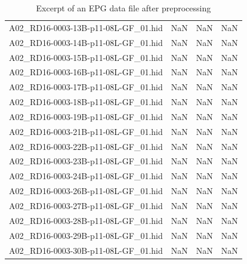 \begin{landscape}
\begin{table}[htbp]
\begin{tabular}{lrrr}
 A02\_RD16-0003-13B-p11-08L-GF\_01.hid &                       NaN &                         NaN &                       NaN \\
 A02\_RD16-0003-14B-p11-08L-GF\_01.hid &                       NaN &                         NaN &                       NaN \\
 A02\_RD16-0003-15B-p11-08L-GF\_01.hid &                       NaN &                         NaN &                       NaN \\
 A02\_RD16-0003-16B-p11-08L-GF\_01.hid &                       NaN &                         NaN &                       NaN \\
 A02\_RD16-0003-17B-p11-08L-GF\_01.hid &                       NaN &                         NaN &                       NaN \\
 A02\_RD16-0003-18B-p11-08L-GF\_01.hid &                       NaN &                         NaN &                       NaN \\
 A02\_RD16-0003-19B-p11-08L-GF\_01.hid &                       NaN &                         NaN &                       NaN \\
 A02\_RD16-0003-21B-p11-08L-GF\_01.hid &                       NaN &                         NaN &                       NaN \\
 A02\_RD16-0003-22B-p11-08L-GF\_01.hid &                       NaN &                         NaN &                       NaN \\
 A02\_RD16-0003-23B-p11-08L-GF\_01.hid &                       NaN &                         NaN &                       NaN \\
 A02\_RD16-0003-24B-p11-08L-GF\_01.hid &                       NaN &                         NaN &                       NaN \\
 A02\_RD16-0003-26B-p11-08L-GF\_01.hid &                       NaN &                         NaN &                       NaN \\
 A02\_RD16-0003-27B-p11-08L-GF\_01.hid &                       NaN &                         NaN &                       NaN \\
 A02\_RD16-0003-28B-p11-08L-GF\_01.hid &                       NaN &                         NaN &                       NaN \\
 A02\_RD16-0003-29B-p11-08L-GF\_01.hid &                       NaN &                         NaN &                       NaN \\
 A02\_RD16-0003-30B-p11-08L-GF\_01.hid &                       NaN &                         NaN &                       NaN \\
\bottomrule
\end{tabular}
\caption{Excerpt of an EPG data file after preprocessing}
\label{table:Excerpt of an EPG data file after preprocessing}
\end{table}
\end{landscape}

